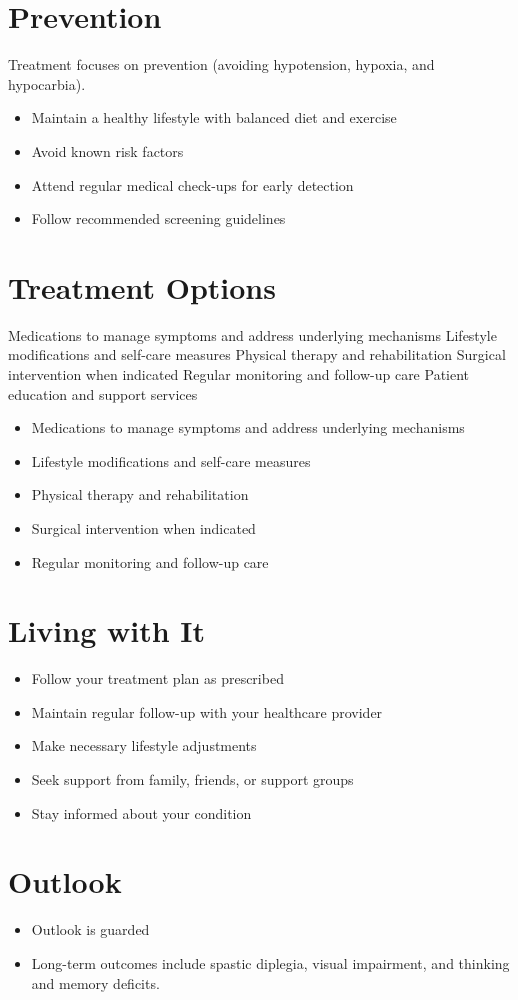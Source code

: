 \section{Prevention}
Treatment focuses on prevention (avoiding hypotension, hypoxia, and hypocarbia).

\begin{itemize}[noitemsep]
  \item Maintain a healthy lifestyle with balanced diet and exercise
  \item Avoid known risk factors
  \item Attend regular medical check-ups for early detection
  \item Follow recommended screening guidelines
\end{itemize}
\section{Treatment Options}
Medications to manage symptoms and address underlying mechanisms Lifestyle modifications and self-care measures Physical therapy and rehabilitation Surgical intervention when indicated Regular monitoring and follow-up care Patient education and support services

\begin{itemize}[noitemsep]
  \item Medications to manage symptoms and address underlying mechanisms
  \item Lifestyle modifications and self-care measures
  \item Physical therapy and rehabilitation
  \item Surgical intervention when indicated
  \item Regular monitoring and follow-up care
\end{itemize}
\section{Living with It}
\begin{itemize}[noitemsep]
  \item Follow your treatment plan as prescribed
  \item Maintain regular follow-up with your healthcare provider
  \item Make necessary lifestyle adjustments
  \item Seek support from family, friends, or support groups
  \item Stay informed about your condition
\end{itemize}
\section{Outlook}
\begin{itemize}[noitemsep]
  \item Outlook is guarded
  \item Long-term outcomes include spastic diplegia, visual impairment, and thinking and memory deficits.
\end{itemize}
